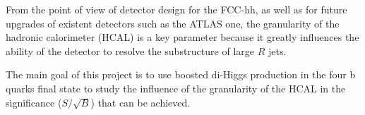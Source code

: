 From the point of view of detector design for the FCC-hh, as well as for future upgrades of existent detectors such as the ATLAS one, the granularity of the hadronic calorimeter (HCAL) is a key parameter because it greatly influences the ability of the detector to resolve the substructure of large $R$ jets. 

The main goal of this project is to use boosted di-Higgs production in the four b quarks final state to study the influence of the granularity of the HCAL in the significance ($S/\sqrt{B}$) that can be achieved.  
